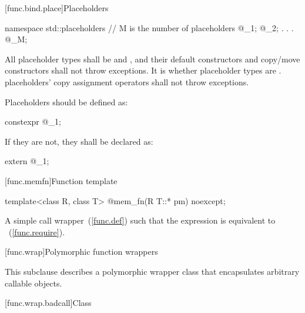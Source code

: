 [func.bind.place]{Placeholders}

%
%
\begin{codeblock}
namespace std::placeholders {
  // M is the  number of placeholders
  @\seebelow@ _1;
  @\seebelow@ _2;
              .
              .
              .
  @\seebelow@ _M;
}
\end{codeblock}

\pnum
All placeholder types shall be  and
, and their default constructors and copy/move
constructors shall not throw exceptions. It is  whether
placeholder types are .  placeholders' copy
assignment operators shall not throw exceptions.%
%

\pnum
Placeholders should be defined as:
\begin{codeblock}
constexpr @\unspec@ _1{};
\end{codeblock}
If they are not, they shall be declared as:
\begin{codeblock}
extern @\unspec@ _1;
\end{codeblock}

[func.memfn]{Function template }%

%
\begin{itemdecl}
template<class R, class T> @\unspec@ mem_fn(R T::* pm) noexcept;
\end{itemdecl}

\begin{itemdescr}
\pnum
\returns A simple call wrapper~(\ref{func.def}) 
such that the expression  is equivalent
to ~(\ref{func.require}).
\end{itemdescr}

[func.wrap]{Polymorphic function wrappers}%

\pnum
This subclause describes a polymorphic wrapper class that
encapsulates arbitrary callable objects.

[func.wrap.badcall]{Class }%
%

